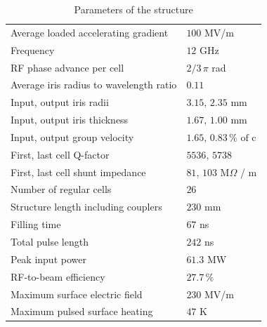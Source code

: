 \begin{table}[h]
  \centering
    \begin{tabular}{ l l  }
    \toprule
    Average loaded accelerating gradient			& $100$ MV/m	\\
    Frequency								& $12$ GHz	\\        
    RF phase advance per cell					& $2/3 \, \pi $ rad	\\       
    Average iris radius to wavelength ratio			& $0.11$	\\ 
    Input, output iris radii      					& $3.15, \, 2.35 $ mm	\\
    Input, output iris thickness      				& $1.67, \, 1.00 $ mm	\\
    Input, output group velocity					& $1.65, \, 0.83 \, \% \text{ of c} $	\\
    First, last cell Q-factor						& $5536,\,5738$\\
    First, last cell shunt impedance				& $81,\,103 $ M$\Omega$ / m\\
    Number of regular cells						& $26$	\\   
    Structure length including couplers			& $230 $ mm	\\   
    Filling time								& $67 $ ns	\\               
    Total pulse length							& $242 $ ns	\\      
    Peak input power 							& $61.3 $ MW	\\        
    RF-to-beam efficiency						& $27.7 \, \%$	\\   
    Maximum surface electric field				& $230 $ MV/m	\\           
    Maximum pulsed surface heating				& $47 $ K	\\       
    \bottomrule
    \end{tabular}
  \caption{Parameters of the structure}
\label{TD26_param_1}
\end{table}

